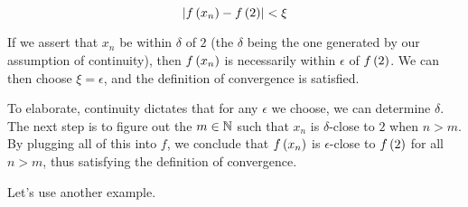 \begin{example}
\begin{enumerate}
    \begin{equation}
      \left| f \left( x_n \right) - f \left( 2 \right) \right| < \xi
    \end{equation}

  \end{enumerate}

  If we assert that $x_n$ be within $\delta$ of $2$ (the $\delta$ being the one
  generated by our assumption of continuity), then $f \left( x_n \right)$ is necessarily
  within $\epsilon$ of $f \left( 2 \right)$. We can then choose $\xi = \epsilon$, and
  the definition of convergence is satisfied.

  To elaborate, continuity dictates that for any $\epsilon$ we choose, we can
  determine $\delta$. The next step is to figure out the $m \in \mathbb{N}$ such that
  $x_n$ is $\delta$-close to $2$ when $n > m$. By plugging all of this into $f$,
  we conclude that $f \left( x_n \right)$ is $\epsilon$-close to $f \left( 2 \right)$ for all
  $n > m$, thus satisfying the definition of convergence.
\end{example}

\begin{example}
  Let's use another example.
\end{example}